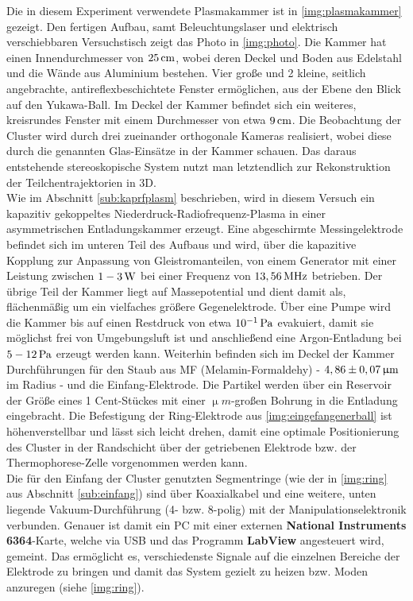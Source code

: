 \documentclass[numbers=noenddot,a4paper,notitlepage,twoside,BCOR15mm]{scrbook}
\newcommand{\tenpo}[1]{ 10^{#1}}
\newcommand{\fett}[1]{\textbf{#1}}
\begin{document}
			Die in diesem Experiment verwendete Plasmakammer ist in \ref{img:plasmakammer} gezeigt. Den fertigen Aufbau, samt Beleuchtungslaser und elektrisch verschiebbaren Versuchstisch zeigt das Photo in \ref{img:photo}. Die Kammer hat einen Innendurchmesser von $\unit[25]{cm}$, wobei deren Deckel und Boden aus Edelstahl und die Wände aus Aluminium bestehen. Vier gro{\ss}e und 2 kleine, seitlich angebrachte, antireflexbeschichtete Fenster erm\"oglichen,  aus der Ebene den Blick auf den Yukawa-Ball. Im Deckel der Kammer befindet sich ein weiteres, kreisrundes Fenster mit einem Durchmesser von etwa $\unit[9]{cm}$. Die Beobachtung der Cluster wird durch drei zueinander orthogonale Kameras realisiert, wobei diese durch die genannten Glas-Einsätze in der Kammer schauen. Das daraus entstehende stereoskopische System nutzt man letztendlich zur Rekonstruktion der Teilchentrajektorien in 3D.\\
			Wie im Abschnitt \ref{sub:kaprfplasm} beschrieben, wird in diesem Versuch ein kapazitiv gekoppeltes Niederdruck-Radiofrequenz-Plasma in einer asymmetrischen Entladungskammer erzeugt. Eine abgeschirmte Messingelektrode befindet sich im unteren Teil des Aufbaus und wird, \"uber die kapazitive Kopplung zur Anpassung von Gleistromanteilen, von einem Generator mit einer Leistung zwischen $\unit[1-3]{W}$ bei einer Frequenz von $\unit[13,56]{MHz}$ betrieben. Der \"ubrige Teil der Kammer liegt auf Massepotential und dient damit als, fl\"achenm\"a{\ss}ig um ein vielfaches gr\"o{\ss}ere Gegenelektrode. \"Uber eine Pumpe wird die Kammer bis auf einen Restdruck von etwa $\unit[\tenpo{-1}]{Pa}$ evakuiert, damit sie m\"oglichst frei von Umgebungsluft ist und anschlie{\ss}end eine Argon-Entladung bei $\unit[5-12]{Pa}$ erzeugt werden kann.
			Weiterhin befinden sich im Deckel der Kammer Durchf\"uhrungen f\"ur den Staub aus MF (Melamin-Formaldehy) - $\unit[4,86\pm0,07]{\upmu m}$ im Radius - und die Einfang-Elektrode. Die Partikel werden \"uber ein Reservoir der Gr\"o{\ss}e eines 1 Cent-St\"uckes mit einer $\unit{\upmu m}$-gro{\ss}en Bohrung in die Entladung eingebracht. Die Befestigung der Ring-Elektrode aus \ref{img:eingefangenerball} ist h\"ohenverstellbar und l\"asst sich leicht drehen, damit eine optimale Positionierung des Cluster in der Randschicht \"uber der getriebenen Elektrode bzw. der Thermophorese-Zelle vorgenommen werden kann.\\
			Die für den Einfang der Cluster genutzten Segmentringe (wie der in \ref{img:ring} aus Abschnitt \ref{sub:einfang}) sind \"uber Koaxialkabel und eine weitere, unten liegende Vakuum-Durchf\"uhrung (4- bzw. 8-polig) mit der Manipulationselektronik verbunden. Genauer ist damit ein PC mit einer externen \fett{National Instruments 6364}-Karte, welche via USB und das Programm \fett{LabView} angesteuert wird, gemeint. Das erm\"oglicht es, verschiedenste Signale auf die einzelnen Bereiche der Elektrode zu bringen und damit das System gezielt zu heizen bzw. Moden anzuregen (siehe \ref{img:ring}). 
\end{document}
